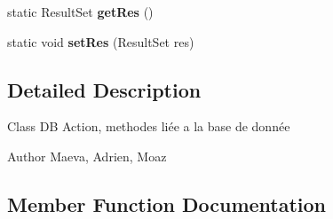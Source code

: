 \begin{DoxyCompactItemize}
\item 
static Result\+Set {\bfseries get\+Res} ()\hypertarget{classcom_1_1ecetech_1_1bti4_1_1itproject_1_1classified_1_1common_1_1_d_b_action_ae8cb329cdf28bc94217b723b422491be}{}\label{classcom_1_1ecetech_1_1bti4_1_1itproject_1_1classified_1_1common_1_1_d_b_action_ae8cb329cdf28bc94217b723b422491be}

\item 
static void {\bfseries set\+Res} (Result\+Set res)\hypertarget{classcom_1_1ecetech_1_1bti4_1_1itproject_1_1classified_1_1common_1_1_d_b_action_a86c0a551394ed96766b38cd4117d49f4}{}\label{classcom_1_1ecetech_1_1bti4_1_1itproject_1_1classified_1_1common_1_1_d_b_action_a86c0a551394ed96766b38cd4117d49f4}

\end{DoxyCompactItemize}


\subsection{Detailed Description}
Class DB Action, methodes liée a la base de donnée \begin{DoxyAuthor}{Author}
Maeva, Adrien, Moaz 
\end{DoxyAuthor}


\subsection{Member Function Documentation}
